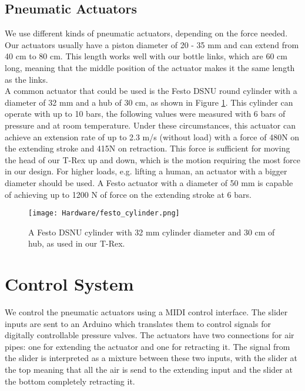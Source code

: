 \subsection{Pneumatic Actuators}
We use different kinds of pneumatic actuators, depending on the force needed. Our actuators usually have a piston diameter of 20 - 35 mm and can extend from 40 cm to 80 cm. This length works well with our bottle links, which are 60 cm long, meaning that the middle position of the actuator makes it the same length as the links.\\
A common actuator that could be used is the Festo DSNU round cylinder with a diameter of 32 mm and a hub of 30 cm, as shown in Figure \ref{fig:festo_cylinder}. This cylinder can operate with up to 10 bars, the following values were measured with 6 bars of pressure and at room temperature. Under these circumstances, this actuator can achieve an extension rate of up to 2.3 m/s (without load) with a force of 480N on the extending stroke and 415N on retraction. This force is sufficient for moving the head of our T-Rex up and down, which is the motion requiring the most force in our design. For higher loads, e.g. lifting a human, an actuator with a bigger diameter should be used. A Festo actuator with a diameter of 50 mm is capable of achieving up to 1200 N of force on the extending stroke at 6 bars.
\begin{figure}[ht!]
    \texttt{[image: Hardware/festo\_cylinder.png]}
    \centering
    \caption{A Festo DSNU cylinder with 32 mm cylinder diameter and 30 cm of hub, as used in our T-Rex.}
    \label{fig:festo_cylinder}
\end{figure}

\section{Control System}
We control the pneumatic actuators using a MIDI control interface. The slider inputs are sent to an Arduino which translates them to control signals for digitally controllable pressure valves. The actuators have two connections for air pipes: one for extending the actuator and one for retracting it. The signal from the slider is interpreted as a mixture between these two inputs, with the slider at the top meaning that all the air is send to the extending input and the slider at the bottom completely retracting it.

